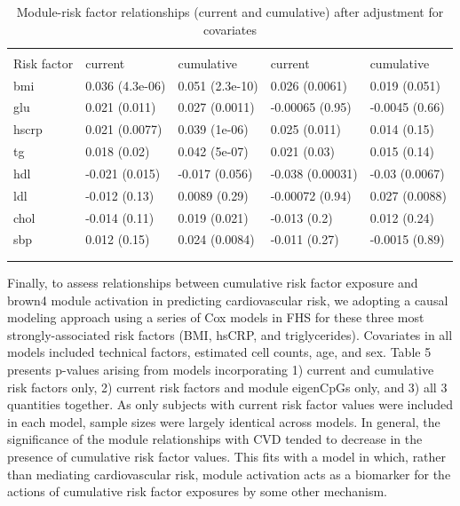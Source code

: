 \documentclass[]{article}
\theoremstyle{definition}
\theoremstyle{definition}
\theoremstyle{definition}
\theoremstyle{remark}
\begin{document}
\begin{table}

\caption{\label{tab:cumulative-adjusted}Module-risk factor relationships (current and cumulative) after adjustment for covariates}
\centering
\begin{tabu} to 
\toprule
{} &  &  \\
\cmidrule(l{2pt}r{2pt}){2-3} \cmidrule(l{2pt}r{2pt}){4-5}
Risk factor & current & cumulative & current & cumulative\\
\midrule
bmi & 0.036 (4.3e-06) & 0.051 (2.3e-10) & 0.026 (0.0061) & 0.019 (0.051)\\
glu & 0.021 (0.011) & 0.027 (0.0011) & -0.00065 (0.95) & -0.0045 (0.66)\\
hscrp & 0.021 (0.0077) & 0.039 (1e-06) & 0.025 (0.011) & 0.014 (0.15)\\
tg & 0.018 (0.02) & 0.042 (5e-07) & 0.021 (0.03) & 0.015 (0.14)\\
hdl & -0.021 (0.015) & -0.017 (0.056) & -0.038 (0.00031) & -0.03 (0.0067)\\
\addlinespace
ldl & -0.012 (0.13) & 0.0089 (0.29) & -0.00072 (0.94) & 0.027 (0.0088)\\
chol & -0.014 (0.11) & 0.019 (0.021) & -0.013 (0.2) & 0.012 (0.24)\\
sbp & 0.012 (0.15) & 0.024 (0.0084) & -0.011 (0.27) & -0.0015 (0.89)\\
\bottomrule
{}\\
\\
\end{tabu}
\end{table}

Finally, to assess relationships between cumulative risk factor exposure
and brown4 module activation in predicting cardiovascular risk, we
adopting a causal modeling approach using a series of Cox models in FHS
for these three most strongly-associated risk factors (BMI, hsCRP, and
triglycerides). Covariates in all models included technical factors,
estimated cell counts, age, and sex. Table 5 presents p-values arising
from models incorporating 1) current and cumulative risk factors only,
2) current risk factors and module eigenCpGs only, and 3) all 3
quantities together. As only subjects with current risk factor values
were included in each model, sample sizes were largely identical across
models. In general, the significance of the module relationships with
CVD tended to decrease in the presence of cumulative risk factor values.
This fits with a model in which, rather than mediating cardiovascular
risk, module activation acts as a biomarker for the actions of
cumulative risk factor exposures by some other mechanism.
\end{document}

